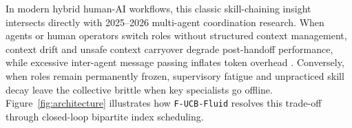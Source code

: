 \documentclass[11pt]{article}
\begin{document}
In modern hybrid human-AI workflows, this classic skill-chaining insight intersects directly with 2025--2026 multi-agent coordination research. When agents or human operators switch roles without structured context management, context drift \citep{rodrigues2026drift} and unsafe context carryover \citep{das2026safecontext} degrade post-handoff performance, while excessive inter-agent message passing inflates token overhead \citep{zhang2025agentprune, bertalanic2026consensus}. Conversely, when roles remain permanently frozen, supervisory fatigue \citep{bainbridge1983ironies, eliav2026divergence} and unpracticed skill decay \citep{shen2026coding} leave the collective brittle when key specialists go offline. Figure~\ref{fig:architecture} illustrates how \texttt{F-UCB-Fluid} resolves this trade-off through closed-loop bipartite index scheduling.
\end{document}
